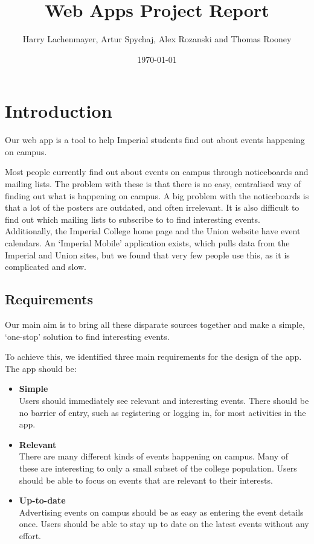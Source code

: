 \documentclass[11pt]{article}
\begin{document}
\title{Web Apps Project Report}

\author{Harry Lachenmayer, Artur Spychaj, Alex Rozanski and Thomas Rooney}

\date{\today}         %

\maketitle            %

\section {Introduction}

Our web app is a tool to help Imperial students find out about events happening on campus.

Most people currently find out about events on campus through noticeboards and mailing lists. The problem with these is that there is no easy, centralised way of finding out what is happening on campus. A big problem with the noticeboards is that a lot of the posters are outdated, and often irrelevant. It is also difficult to find out which mailing lists to subscribe to to find interesting events. Additionally, the Imperial College home page and the Union website have event calendars. An `Imperial Mobile' application exists, which pulls data from the Imperial and Union sites, but we found that very few people use this, as it is complicated and slow.

\subsection{Requirements}

Our main aim is to bring all these disparate sources together and make a simple, `one-stop' solution to find interesting events.

To achieve this, we identified three main requirements for the design of the app. The app should be:

\begin{itemize}
    \item \textbf{Simple} \\[0.5em] Users should immediately see relevant and interesting events. There should be no barrier of entry, such as registering or logging in, for most activities in the app.

    \item \textbf{Relevant} \\[0.5em] There are many different kinds of events happening on campus. Many of these are interesting to only a small subset of the college population. Users should be able to focus on events that are relevant to their interests.

    \item \textbf{Up-to-date} \\[0.5em] Advertising events on campus should be as easy as entering the event details once. Users should be able to stay up to date on the latest events without any effort.

\end{itemize}
\end{document}
